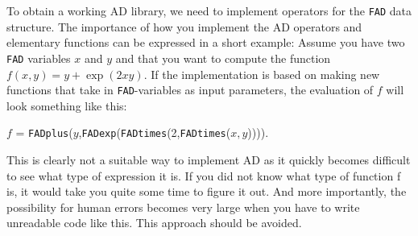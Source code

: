 To obtain a working AD library, we need to implement operators for the \texttt{FAD} data structure. The importance of how you implement the AD operators and elementary functions can be expressed in a short example: Assume you have two \texttt{FAD} variables $x$ and $y$ and that you want to compute the function $f(x,y) = y+\exp(2xy)$. If the implementation is based on making new functions that take in \texttt{FAD}-variables as input parameters, the evaluation of $f$ will look something like this: 
\begin{center}
    $f$ = \texttt{FADplus}($y$,\texttt{FADexp}(\texttt{FADtimes}(2,\texttt{FADtimes}($x,y$)))).
\end{center}
This is clearly not a suitable way to implement AD as it quickly becomes difficult to see what type of expression it is. If you did not know what type of function f is, it would take you quite some time to figure it out. And more importantly, the possibility for human errors becomes very large when you have to write unreadable code like this. This approach should be avoided. 

